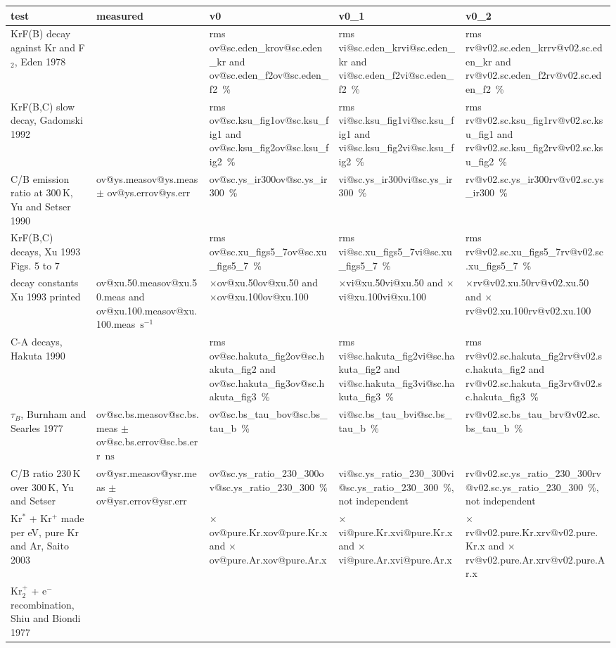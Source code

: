 \documentclass[11pt]{article}
\makeatletter
\newcommand\ov[1]{\ifcsname ov@#1\endcsname\csname ov@#1\endcsname
  \else\errmessage{no v0 overview number '#1'}\fi}
\newcommand\vi[1]{\ifcsname vi@#1\endcsname\csname vi@#1\endcsname
  \else\errmessage{no v0_1 overview number '#1'}\fi}
\newcommand\rv[1]{\ifcsname rv@#1\endcsname\csname rv@#1\endcsname
  \else\errmessage{no review number '#1'. Rerun make_review.py}\fi}
\newcommand{\unit}[1]{\ensuremath{\,\mathrm{#1}}}
\newcommand{\el}{\ensuremath{\mathrm{e}^-}}
\newcommand{\Krs}{Kr\ensuremath{^*}}
\newcommand{\Krp}{Kr\ensuremath{^+}}
\newcommand{\Krtp}{Kr\ensuremath{_2^+}}
\newcommand{\x}[1]{\ensuremath{\times}#1}
\makeatother
\begin{document}
\begin{table}[htbp]
\centering\footnotesize
\renewcommand{\arraystretch}{1.12}
\begin{tabularx}{\linewidth}{@{}>{\raggedright\arraybackslash}X
  >{\raggedright\arraybackslash}p{1.9cm}>{\raggedright\arraybackslash}p{2.35cm}
  >{\raggedright\arraybackslash}p{2.35cm}
  >{\raggedright\arraybackslash}p{2.35cm}@{}}
\toprule
test & measured & v0 & v0\_1 & v0\_2\\
\midrule
KrF(B) decay against Kr and F$_2$, Eden 1978 & & rms \ov{sc.eden_kr} and
  \ov{sc.eden_f2}\,\% & rms \vi{sc.eden_kr} and \vi{sc.eden_f2}\,\% & rms
  \rv{v02.sc.eden_kr} and \rv{v02.sc.eden_f2}\,\%\\
KrF(B,C) slow decay, Gadomski 1992 & & rms \ov{sc.ksu_fig1} and
  \ov{sc.ksu_fig2}\,\% & rms \vi{sc.ksu_fig1} and \vi{sc.ksu_fig2}\,\% &
  rms \rv{v02.sc.ksu_fig1} and \rv{v02.sc.ksu_fig2}\,\%\\
C/B emission ratio at 300\unit{K}, Yu and Setser 1990 & \ov{ys.meas}
  $\pm$ \ov{ys.err} & \ov{sc.ys_ir300}\,\% & \vi{sc.ys_ir300}\,\% &
  \rv{v02.sc.ys_ir300}\,\%\\
KrF(B,C) decays, Xu 1993 Figs. 5 to 7 & & rms \ov{sc.xu_figs5_7}\,\% &
  rms \vi{sc.xu_figs5_7}\,\% & rms \rv{v02.sc.xu_figs5_7}\,\%\\
decay constants Xu 1993 printed & \ov{xu.50.meas} and
  \ov{xu.100.meas}\unit{s^{-1}} & \x{\ov{xu.50}} and \x{\ov{xu.100}} &
  \x{\vi{xu.50}} and \x{\vi{xu.100}} & \x{\rv{v02.xu.50}} and
  \x{\rv{v02.xu.100}}\\
C-A decays, Hakuta 1990 & & rms \ov{sc.hakuta_fig2} and
  \ov{sc.hakuta_fig3}\,\% & rms \vi{sc.hakuta_fig2} and
  \vi{sc.hakuta_fig3}\,\% & rms \rv{v02.sc.hakuta_fig2} and
  \rv{v02.sc.hakuta_fig3}\,\%\\
$\tau_B$, Burnham and Searles 1977 & \ov{sc.bs.meas} $\pm$
  \ov{sc.bs.err}\unit{ns} & \ov{sc.bs_tau_b}\,\% & \vi{sc.bs_tau_b}\,\% &
  \rv{v02.sc.bs_tau_b}\,\%\\
C/B ratio 230\unit{K} over 300\unit{K}, Yu and Setser & \ov{ysr.meas}
  $\pm$ \ov{ysr.err} & \ov{sc.ys_ratio_230_300}\,\% &
  \vi{sc.ys_ratio_230_300}\,\%, not independent &
  \rv{v02.sc.ys_ratio_230_300}\,\%, not independent\\
\midrule
\Krs{} + \Krp{} made per eV, pure Kr and Ar, Saito 2003 & &
  \x{\ov{pure.Kr.x}} and \x{\ov{pure.Ar.x}} & \x{\vi{pure.Kr.x}} and
  \x{\vi{pure.Ar.x}} & \x{\rv{v02.pure.Kr.x}} and \x{\rv{v02.pure.Ar.x}}\\
\Krtp{} + \el{} recombination, Shiu and Biondi 1977 & &

\end{tabularx}
\end{table}
\end{document}

